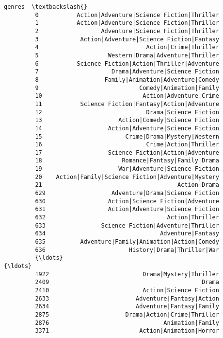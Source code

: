 \documentclass[11pt]{article}
\begin{document}
\begin{Verbatim}[commandchars=\\\{\}]
                                                        genres  \textbackslash{}
         0           Action|Adventure|Science Fiction|Thriller   
         1           Action|Adventure|Science Fiction|Thriller   
         2                  Adventure|Science Fiction|Thriller   
         3            Action|Adventure|Science Fiction|Fantasy   
         4                               Action|Crime|Thriller   
         5                    Western|Drama|Adventure|Thriller   
         6           Science Fiction|Action|Thriller|Adventure   
         7                     Drama|Adventure|Science Fiction   
         8                   Family|Animation|Adventure|Comedy   
         9                             Comedy|Animation|Family   
         10                             Action|Adventure|Crime   
         11           Science Fiction|Fantasy|Action|Adventure   
         12                              Drama|Science Fiction   
         13                      Action|Comedy|Science Fiction   
         14                   Action|Adventure|Science Fiction   
         15                        Crime|Drama|Mystery|Western   
         16                              Crime|Action|Thriller   
         17                   Science Fiction|Action|Adventure   
         18                       Romance|Fantasy|Family|Drama   
         19                      War|Adventure|Science Fiction   
         20    Action|Family|Science Fiction|Adventure|Mystery   
         21                                       Action|Drama   
         629                   Adventure|Drama|Science Fiction   
         630                  Action|Science Fiction|Adventure   
         631                  Action|Adventure|Science Fiction   
         632                                   Action|Thriller   
         633                Science Fiction|Adventure|Thriller   
         634                                 Adventure|Fantasy   
         635          Adventure|Family|Animation|Action|Comedy   
         636                        History|Drama|Thriller|War   
         {\ldots}                                               {\ldots}   
         1922                           Drama|Mystery|Thriller   
         2409                                            Drama   
         2410                           Action|Science Fiction   
         2633                         Adventure|Fantasy|Action   
         2634                         Adventure|Fantasy|Family   
         2875                      Drama|Action|Crime|Thriller   
         2876                                 Animation|Family   
         3371                          Action|Animation|Horror   

\end{Verbatim}
\end{document}
